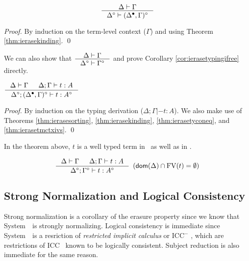 \begin{theorem}
\label{thm:ierasetmctxivs}
\[ \inference{\Delta |- \Gamma}{\Delta^\circ |- (\Delta^\bullet,\Gamma)^\circ}
\]
\end{theorem}
\begin{proof}
        By induction on the term-level context ($\Gamma$)
        and using Theorem \ref{thm:ierasekinding}.
        \qed
\end{proof}
\begin{remark}
We can also show that
$\inference{\Delta |- \Gamma}{\Delta^\circ |- \Gamma^\circ}$
and prove Corollary \ref{cor:ierasetypingifree} directly.
\end{remark}

\begin{theorem}
\label{thm:ierasetypingall}
$ \inference{\Delta |- \Gamma & \Delta;\Gamma |- t : A}
                {\Delta^\circ;(\Delta^\bullet,\Gamma)^\circ |- t : A^\circ}
$
\end{theorem}
\begin{proof}
        By induction on the typing derivation ($\Delta;\Gamma |- t : A$).
        We also make use of Theorems
        \ref{thm:ierasesorting},
        \ref{thm:ierasekinding},
        \ref{thm:ierasetyconeq}, and
        \ref{thm:ierasetmctxivs}.
        \qed
\end{proof}
\begin{remark}
        In the theorem above, $t$ is a well typed term
        in \Fw\ as well as in \Fi.
\end{remark}

\begin{corollary}
\label{cor:ierasetypingifree}
\[ \inference{ \Delta |- \Gamma & \Delta;\Gamma |- t : A}
                {\Delta^\circ;\Gamma^\circ |- t : A^\circ}
                {\enspace(\dom(\Delta)\cap\FV(t) = \emptyset)}
\]
\end{corollary}

\subsection{Strong Normalization and Logical Consistency} \label{ssec:sn}
Strong normalization is a corollary of the erasure property since we know that
System~\Fw\ is strongly normalizing. Logical consistency is immediate since
System~\Fi\ is a resriction of \emph{restricted implicit calculus}
\cite{Miquel00} or $\text{ICC}^{-}$ \cite{BarrasB08}, which are
restrictions of ICC~\cite{Miquel01} known to be logically consistent.
Subject reduction is also immediate for the same reason.

